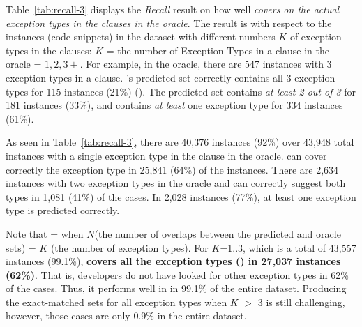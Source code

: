 Table~\ref{tab:recall-3} displays the {\em Recall} result on how well
{\em {\tool} covers on the actual exception types in the 
  clauses in the oracle}. The result is with respect to the instances
(code snippets) in the dataset with different numbers $K$ of exception
types in the  clauses: $K$ = the number of Exception Types
in a  clause in the oracle = $1,2,3+$. For example, in the
oracle, there are 547 instances with 3 exception types in a
 clause. {\tool}'s predicted set correctly contains all 3
exception types for 115 instances (21\%) (). The
predicted set contains {\em at least 2 out of 3} for 181 instances
(33\%), and contains {\em at least} one exception type for 334 instances
(61\%).



As seen in Table~\ref{tab:recall-3}, there are 40,376 instances (92\%)
over 43,948 total instances with a single exception type in the
 clause in the oracle. {\tool} can cover correctly the
exception type in 25,841 (64\%) of the instances. There are 2,634
instances with two exception types in the oracle and {\tool} can
correctly suggest both types in 1,081 (41\%) of the cases. In 2,028
instances (77\%), at least one exception type is predicted correctly.

Note that  =  when $N$(the number of
overlaps between the predicted and oracle sets) = $K$ (the number of
exception types). For $K$=1..3, which is a total of 43,557 instances
(99.1\%), {\bf {\tool} covers all the exception types ()
  in 27,037 instances (62\%)}. That is, developers do not have looked
for other exception types in 62\% of the cases. Thus, it performs well
in  in 99.1\% of the entire dataset. Producing the
exact-matched sets for all exception types when $K$ $>$ 3 is still
challenging, however, those cases are only 0.9\% in the entire
dataset.

